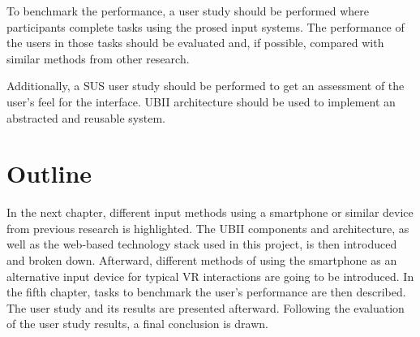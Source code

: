 To benchmark the performance, a user study should be performed where participants complete tasks using the prosed input systems.
The performance of the users in those tasks should be evaluated and, if possible, compared with similar methods from other research.

Additionally, a \ac{SUS} user study should be performed to get an assessment of the user's feel for the interface.
\ac{UBII} architecture should be used to implement an abstracted and reusable system.


\section{Outline}\label{section:outline}
In the next chapter, different input methods using a smartphone or similar device from previous research is highlighted. The \ac{UBII} components and architecture, as well as the web-based technology stack used in this project, is then introduced and broken down. Afterward, different methods of using the smartphone as an alternative input device for typical \ac{VR} interactions are going to be introduced. In the fifth chapter, tasks to benchmark the user's performance are then described. The user study and its results are presented afterward. Following the evaluation of the user study results, a final conclusion is drawn.